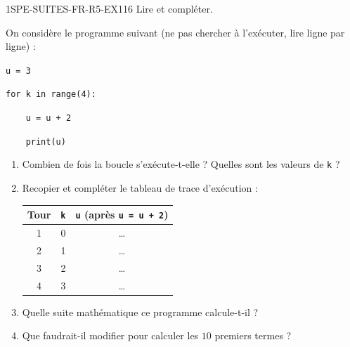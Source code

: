 \begin{exercice}{1SPE-SUITES-FR-R5-EX1}{1}{6}
Lire et compléter.

On considère le programme suivant (ne pas chercher à l'exécuter, lire ligne par ligne) :

\medskip
\verb|u = 3|

\verb|for k in range(4):|

\verb|    u = u + 2|

\verb|    print(u)|

\begin{enumerate}
  \item Combien de fois la boucle s'exécute-t-elle ? Quelles sont les valeurs de \verb|k| ?
  \item Recopier et compléter le tableau de trace d'exécution :

\begin{center}
\begin{tabular}{|c|c|c|}
\hline
Tour & \verb|k| & \verb|u| (après \verb|u = u + 2|) \\
\hline
1 & 0 & \ldots \\
2 & 1 & \ldots \\
3 & 2 & \ldots \\
4 & 3 & \ldots \\
\hline
\end{tabular}
\end{center}

  \item Quelle suite mathématique ce programme calcule-t-il ?
  \item Que faudrait-il modifier pour calculer les $10$ premiers termes ?
\end{enumerate}
\end{exercice}

